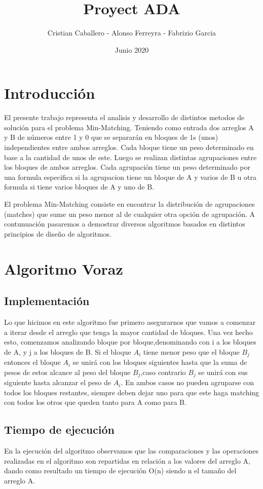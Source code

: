 \documentclass{article}
\title{Proyect ADA}
\author{Cristian Caballero - Alonso Ferreyra - Fabrizio Garcia }
\date{Junio 2020}
\begin{document}
\maketitle

\section{Introducción}
El presente trabajo representa el analisis y desarrollo de distintos metodos de solución para el problema Min-Matching. Teniendo como entrada dos arreglos A y B de números entre 1 y 0 que se separarán en bloques de 1s (unos) independientes entre ambos arreglos. Cada bloque tiene un peso determinado en base a la cantidad de unos de este. Luego se realizan distintas agrupaciones entre los bloques de ambos arreglos. Cada agrupación tiene un peso determinado por una formula especifica si la agrupacion tiene un bloque de A y varios de B u otra formula si tiene varios bloques de A y uno de B. 

El problema Min-Matching consiste en encontrar la distribución de agrupaciones (matches) que sume un peso menor al de cualquier otra opción de agrupación. A contunuación pasaremos a demostrar diversos algoritmos basados en distintos principios de diseño de algoritmos.

\section{Algoritmo Voraz}
\subsection{Implementación}
Lo que hicimos en este algoritmo fue primero asegurarnos que vamos a comenzar a iterar desde el arreglo que tenga la mayor cantidad de bloques.
Una vez hecho esto, comenzamos analizando bloque por bloque,denominando con i a los bloques de A, y j a los bloques de B. Si el bloque $A_i$ tiene menor peso que el bloque $B_j$ entonces el bloque $A_i$ se unirá con los bloques siguientes hasta que la suma de pesos de estos alcance al peso del bloque $B_j$,caso contrario $B_j$ se unirá con sus siguiente hasta alcanzar el peso de $A_i$. En ambos casos no pueden agruparse con todos los bloques restantes, siempre deben dejar uno para que este haga matching con todos los otros que queden tanto para A como para B.
\subsection{Tiempo de ejecución}
En la ejecución del algoritmo observamos que las comparaciones y las operaciones realizadas en el algoritmo son repartidas en relación a los valores del arreglo A, dando como resultado un tiempo de ejecución O(n) siendo n el tamaño del arreglo A.
\end{document}
